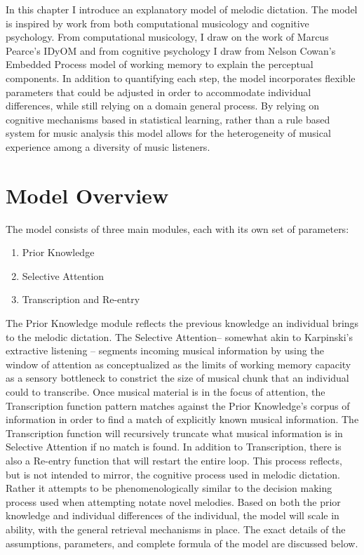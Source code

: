 \documentclass[]{book}
\providecommand{\tightlist}{%
  \setlength{\itemsep}{0pt}\setlength{\parskip}{0pt}}
\begin{document}
In this chapter I introduce an explanatory model of melodic dictation.
The model is inspired by work from both computational musicology and cognitive psychology.
From computational musicology, I draw on the work of Marcus Pearce's IDyOM \citep{pearceConstructionEvaluationStatistical2005} and from cognitive psychology I draw from Nelson Cowan's Embedded Process model of working memory \citep{cowanEvolvingConceptionsMemory1988, cowanMagicalMysteryFour2010} to explain the perceptual components.
In addition to quantifying each step, the model incorporates flexible parameters that could be adjusted in order to accommodate individual differences, while still relying on a domain general process.
By relying on cognitive mechanisms based in statistical learning, rather than a rule based system for music analysis \citep{lerdahlGenerativeTheoryTonal1986, narmourAnalysisCognitionBasic1990, narmourAnalysisCognitionMelodic1992, temperleyCognitionBasicMusical2004} this model allows for the heterogeneity of musical experience among a diversity of music listeners.

\hypertarget{model-overview}{%
\section{Model Overview}\label{model-overview}}

The model consists of three main modules, each with its own set of parameters:

\begin{enumerate}
\def\labelenumi{\arabic{enumi}.}
\tightlist
\item
  Prior Knowledge
\item
  Selective Attention
\item
  Transcription and Re-entry
\end{enumerate}

The Prior Knowledge module reflects the previous knowledge an individual brings to the melodic dictation.
The Selective Attention-- somewhat akin to Karpinski's extractive listening \citep{karpinskiAuralSkillsAcquisition2000, karpinskiModelMusicPerception1990}-- segments incoming musical information by using the window of attention as conceptualized as the limits of working memory capacity as a sensory bottleneck to constrict the size of musical chunk that an individual could to transcribe.
Once musical material is in the focus of attention, the Transcription function pattern matches against the Prior Knowledge's corpus of information in order to find a match of explicitly known musical information.
The Transcription function will recursively truncate what musical information is in Selective Attention if no match is found.
In addition to Transcription, there is also a Re-entry function that will restart the entire loop.
This process reflects, but is not intended to mirror, the cognitive process used in melodic dictation.
Rather it attempts to be phenomenologically similar to the decision making process used when attempting notate novel melodies.
Based on both the prior knowledge and individual differences of the individual, the model will scale in ability, with the general retrieval mechanisms in place.
The exact details of the assumptions, parameters, and complete formula of the model are discussed below.
\end{document}

